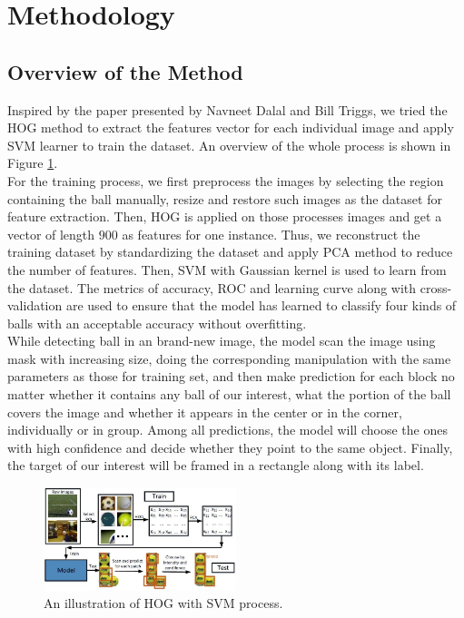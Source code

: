 \documentclass{article}
\begin{document}
\section{Methodology} 

\subsection{Overview of the Method}
Inspired by the paper \cite{dalal2005histograms} presented by Navneet Dalal and Bill Triggs, we tried the HOG method to extract the features vector for each individual image and apply SVM learner to train the dataset. An overview of the whole process is shown in Figure \ref{fig:overview}.\\
For the training process, we first preprocess the images by selecting the region containing the ball manually, resize and restore such images as the dataset for feature extraction. Then, HOG is applied on those processes images and get a vector of length $900$ as features for one instance. Thus, we reconstruct the training dataset by standardizing the dataset and apply PCA method to reduce the number of features. Then, SVM with Gaussian kernel is used to learn from the dataset. The metrics of accuracy, ROC and learning curve along with cross-validation are used to ensure that the model has learned to classify four kinds of balls with an acceptable accuracy without overfitting.\\
While detecting ball in an brand-new image, the model scan the image using mask with increasing size, doing the corresponding manipulation with the same parameters as those for training set, and then make prediction for each block no matter whether it contains any ball of our interest, what the portion of the ball covers the image and whether it appears in the center or in the corner, individually or in group. Among all predictions, the model will choose the ones with high confidence and decide whether they point to the same object. Finally, the target of our interest will be framed in a rectangle along with its label.

\begin{figure}[htp]
\centering
\includegraphics[width=0.5\textwidth]{overview.jpg}
\caption{An illustration of HOG with SVM process.}
\label{fig:overview}
\end{figure}
\end{document}
